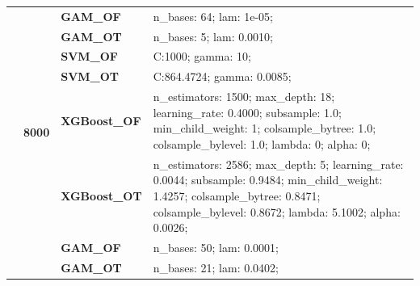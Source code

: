 \documentclass[runningheads]{llncs}
\begin{document}
\begin{table}
\begin{tabularx}{\textwidth}{>{\RaggedRight\arraybackslash}m{1.6cm}p{1.225cm}p{2.05cm}>{\RaggedRight\arraybackslash}X}
        \cline{2-4}
        \textbf{}                               & \multirow[t]{7}{*}{\textbf{8000}} & \textbf{GAM\_OF}     & n\_bases: 64; lam: 1e-05;                                                                                                                                                                         \\
        \textbf{}                               & \textbf{}                         & \textbf{GAM\_OT}     & n\_bases: 5; lam: 0.0010;                                                                                                                                                                         \\
        \textbf{}                               & \textbf{}                         & \textbf{SVM\_OF}     & C:\@1000; gamma: 10;                                                                                                                                                                               \\
        \textbf{}                               & \textbf{}                         & \textbf{SVM\_OT}     & C:\@864.4724; gamma: 0.0085;                                                                                                                                                                       \\
        \textbf{}                               & \textbf{}                         & \textbf{XGBoost\_OF} & n\_estimators: 1500; max\_depth: 18; learning\_rate: 0.4000; subsample: 1.0; min\_child\_weight: 1; colsample\_bytree: 1.0; colsample\_bylevel: 1.0; lambda: 0; alpha: 0;                         \\
        \textbf{}                               & \textbf{}                         & \textbf{XGBoost\_OT} & n\_estimators: 2586; max\_depth: 5; learning\_rate: 0.0044; subsample: 0.9484; min\_child\_weight: 1.4257; colsample\_bytree: 0.8471; colsample\_bylevel: 0.8672; lambda: 5.1002; alpha: 0.0026;  \\
        \cline{1-4}
        \multirow[t]{14}{=}{\textbf{Friedman1}} & \multirow[t]{7}{*}{\textbf{1000}} & \textbf{GAM\_OF}     & n\_bases: 50; lam: 0.0001;                                                                                                                                                                        \\
        \textbf{}                               & \textbf{}                         & \textbf{GAM\_OT}     & n\_bases: 21; lam: 0.0402;                                                                                                                                                                        \\

\end{tabularx}
\end{table}
\end{document}
